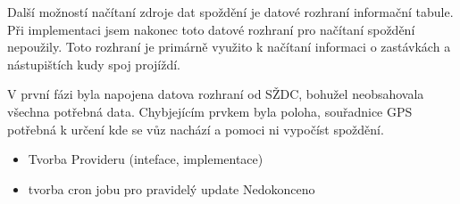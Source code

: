 Další možností načítaní zdroje dat spoždění je datové rozhraní informační tabule. Při implementaci jsem nakonec toto datové rozhraní pro načítaní spoždění nepoužily. Toto rozhraní je primárně  využito k načítaní informaci o zastávkách a nástupištích kudy spoj projíždí.

V první fázi byla napojena datova rozhraní od SŽDC, bohužel neobsahovala všechna potřebná data. Chybjejícím prvkem byla poloha, souřadnice GPS potřebná k určení kde se vůz nachází a pomoci ni vypočíst spoždění.
\begin{itemize}
	\setlength{\parskip}{0pt}
	\setlength{\itemsep}{0pt}
	\item Tvorba Provideru (inteface, implementace)
	
	
	\item tvorba cron jobu pro pravidelý update
	Nedokonceno
\end{itemize}

